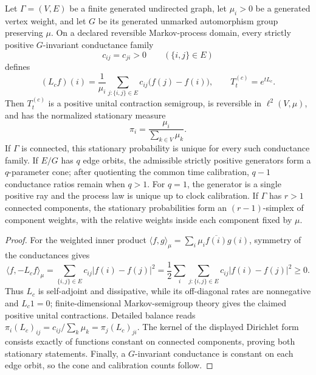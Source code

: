 \documentclass[12pt,a4paper]{article}
\begin{document}
\begin{theorem}
\label{p4:thm:generated-reversible-mixing-graph}
Let \(\Gamma=(V,E)\) be a finite generated undirected graph, let
\(\mu_i>0\) be a generated vertex weight, and let \(G\) be its generated
unmarked automorphism group preserving \(\mu\).  On a declared reversible
Markov-process domain, every strictly positive \(G\)-invariant conductance
family
\[
 c_{ij}=c_{ji}>0\qquad(\{i,j\}\in E)
\]
defines
\[
 (L_cf)(i)=\frac1{\mu_i}\sum_{j:\{i,j\}\in E}
 c_{ij}\bigl(f(j)-f(i)\bigr),
 \qquad T_t^{(c)}=e^{tL_c}.
\]
Then \(T_t^{(c)}\) is a positive unital contraction semigroup, is reversible
in \(\ell^2(V,\mu)\), and has the normalized stationary measure
\[
 \boxed{\pi_i=\frac{\mu_i}{\sum_{k\in V}\mu_k}.}
\]
If \(\Gamma\) is connected, this stationary probability is unique for every
such conductance family.  If \(E/G\) has \(q\) edge orbits, the admissible
strictly positive generators form a \(q\)-parameter cone; after quotienting
the common time calibration, \(q-1\) conductance ratios remain when \(q>1\).
For \(q=1\), the generator is a single positive ray and the process law is
unique up to clock calibration.  If \(\Gamma\) has \(r>1\) connected
components, the stationary probabilities form an \((r-1)\)-simplex of
component weights, with the relative weights inside each component fixed by
\(\mu\).
\end{theorem}

\begin{proof}
For the weighted inner product
\(\langle f,g\rangle_\mu=\sum_i\mu_i\overline{f(i)}g(i)\), symmetry of the
conductances gives
\[
 \langle f,-L_cf\rangle_\mu
 =\sum_{\{i,j\}\in E}c_{ij}|f(i)-f(j)|^2
 =\frac12\sum_i\sum_{j:\{i,j\}\in E}
       c_{ij}|f(i)-f(j)|^2\ge0.
\]
Thus \(L_c\) is self-adjoint and dissipative, while its off-diagonal rates
are nonnegative and \(L_c1=0\); finite-dimensional Markov-semigroup theory
gives the claimed positive unital contractions.  Detailed balance reads
\(\pi_i(L_c)_{ij}=c_{ij}/\sum_k\mu_k=\pi_j(L_c)_{ji}\).
The kernel of the displayed Dirichlet form consists exactly of functions
constant on connected components, proving both stationary statements.
Finally, a \(G\)-invariant conductance is constant on each edge orbit, so the
cone and calibration counts follow.
\end{proof}
\end{document}
